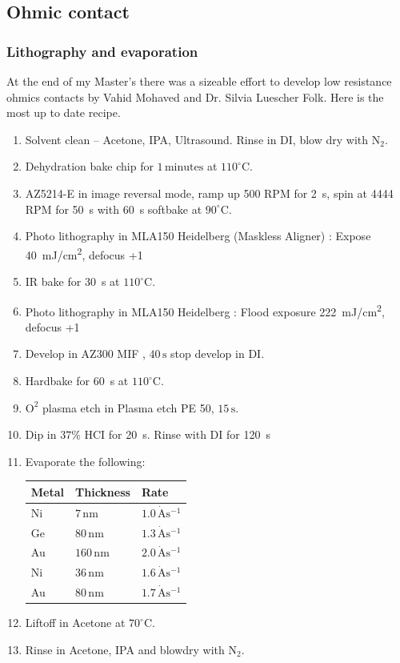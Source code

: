 \subsection{Ohmic contact}

\subsubsection{Lithography and evaporation}


At the end of my Master's there was a sizeable effort to develop low resistance ohmics contacts by Vahid Mohaved and Dr. Silvia Luescher Folk. Here is the most up to date recipe. 


\begin{enumerate}
\item Solvent clean – Acetone, IPA, Ultrasound. Rinse in DI, blow dry with $\mathrm{N_2}$.
\item Dehydration bake chip for $1 \,\mathrm{minutes}$ at $110^\circ$C.
\item AZ5214-E  in image reversal mode, ramp up 500 RPM  for \qty{2}{s}, spin at 4444 RPM for \qty{50}{s} with \qty{60}{s} softbake at $90^\circ$C.
\item Photo lithography in MLA150 Heidelberg (Maskless Aligner) : Expose \qty{40}{mJ/cm^2}, defocus +1 
\item IR bake for \qty{30}{s} at $110^\circ$C.
\item Photo lithography in MLA150 Heidelberg : Flood exposure \qty{222}{mJ/cm^2}, defocus +1 
\item Develop in AZ300 MIF , $40\,\mathrm{s}$ stop develop in DI.
\item Hardbake for \qty{60}{s} at $110^\circ$C.
\item $\mathrm{O^2}$ plasma etch in Plasma etch PE 50, $15\,\mathrm{s}$.
\item Dip in $37\%$ HCI for \qty{20}{s}. Rinse with DI for \qty{120}{s}

\item Evaporate the following:

\begin{table}[H]     
\centering
  \begin{tabular}{|p{2.0cm}|p{2.0cm}|p{2.0cm}|}
    \hline
    Metal & Thickness & Rate\\
    \hline
    Ni & $7\,\mathrm{nm}$ & $1.0\,\mathrm{\dot{A}s^{-1}}$\\
    Ge & $80\,\mathrm{nm}$ & $1.3\,\mathrm{\dot{A}s^{-1}}$\\
    Au & $160\,\mathrm{nm}$ & $2.0\,\mathrm{\dot{A}s^{-1}}$\\
    Ni & $36\,\mathrm{nm}$ & $1.6\,\mathrm{\dot{A}s^{-1}}$\\
    Au & $80\,\mathrm{nm}$ & $1.7\,\mathrm{\dot{A}s^{-1}}$\\
    \hline
  \end{tabular}
\label{tab:ohmic_evaporation}
\end{table}
\item Liftoff in Acetone at $70^\circ$C.
\item Rinse in Acetone, IPA and blowdry with $\mathrm{N_2}$.
\end{enumerate}




